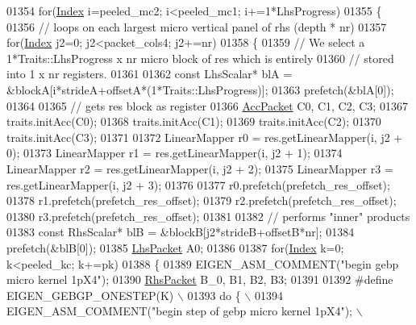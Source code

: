 \begin{DoxyCode}
01354       \textcolor{keywordflow}{for}(\hyperlink{namespace_eigen_a62e77e0933482dafde8fe197d9a2cfde}{Index} i=peeled\_mc2; i<peeled\_mc1; i+=1*LhsProgress)
01355       \{
01356         \textcolor{comment}{// loops on each largest micro vertical panel of rhs (depth * nr)}
01357         \textcolor{keywordflow}{for}(\hyperlink{namespace_eigen_a62e77e0933482dafde8fe197d9a2cfde}{Index} j2=0; j2<packet\_cols4; j2+=nr)
01358         \{
01359           \textcolor{comment}{// We select a 1*Traits::LhsProgress x nr micro block of res which is entirely}
01360           \textcolor{comment}{// stored into 1 x nr registers.}
01361           
01362           \textcolor{keyword}{const} LhsScalar* blA = &blockA[i*strideA+offsetA*(1*Traits::LhsProgress)];
01363           prefetch(&blA[0]);
01364 
01365           \textcolor{comment}{// gets res block as register}
01366           \hyperlink{class_eigen_1_1internal_1_1_tensor_lazy_evaluator_writable}{AccPacket} C0, C1, C2, C3;
01367           traits.initAcc(C0);
01368           traits.initAcc(C1);
01369           traits.initAcc(C2);
01370           traits.initAcc(C3);
01371 
01372           LinearMapper r0 = res.getLinearMapper(i, j2 + 0);
01373           LinearMapper r1 = res.getLinearMapper(i, j2 + 1);
01374           LinearMapper r2 = res.getLinearMapper(i, j2 + 2);
01375           LinearMapper r3 = res.getLinearMapper(i, j2 + 3);
01376 
01377           r0.prefetch(prefetch\_res\_offset);
01378           r1.prefetch(prefetch\_res\_offset);
01379           r2.prefetch(prefetch\_res\_offset);
01380           r3.prefetch(prefetch\_res\_offset);
01381 
01382           \textcolor{comment}{// performs "inner" products}
01383           \textcolor{keyword}{const} RhsScalar* blB = &blockB[j2*strideB+offsetB*nr];
01384           prefetch(&blB[0]);
01385           \hyperlink{class_eigen_1_1internal_1_1_tensor_lazy_evaluator_writable}{LhsPacket} A0;
01386 
01387           \textcolor{keywordflow}{for}(\hyperlink{namespace_eigen_a62e77e0933482dafde8fe197d9a2cfde}{Index} k=0; k<peeled\_kc; k+=pk)
01388           \{
01389             EIGEN\_ASM\_COMMENT(\textcolor{stringliteral}{"begin gebp micro kernel 1pX4"});
01390             \hyperlink{class_eigen_1_1internal_1_1_tensor_lazy_evaluator_writable}{RhsPacket} B\_0, B1, B2, B3;
01391                
01392 \textcolor{preprocessor}{#define EIGEN\_GEBGP\_ONESTEP(K) \(\backslash\)}
01393 \textcolor{preprocessor}{            do \{                                                                \(\backslash\)}
01394 \textcolor{preprocessor}{              EIGEN\_ASM\_COMMENT("begin step of gebp micro kernel 1pX4");        \(\backslash\)}

\end{DoxyCode}
